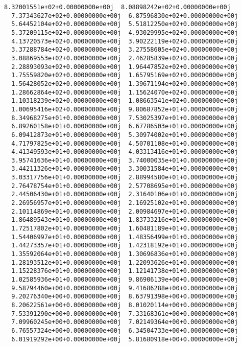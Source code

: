 \documentclass[11pt]{article}
\begin{document}
\begin{Verbatim}[commandchars=\\\{\}]
  8.32001551e+02+0.00000000e+00j  8.08898242e+02+0.00000000e+00j
  7.37343627e+02+0.00000000e+00j  6.87596830e+02+0.00000000e+00j
  5.64452104e+02+0.00000000e+00j  5.51812250e+02+0.00000000e+00j
  5.37209115e+02+0.00000000e+00j  4.93029995e+02+0.00000000e+00j
  4.13720573e+02+0.00000000e+00j  3.90222119e+02+0.00000000e+00j
  3.37288784e+02+0.00000000e+00j  3.27558605e+02+0.00000000e+00j
  3.08869553e+02+0.00000000e+00j  2.46285839e+02+0.00000000e+00j
  2.28893093e+02+0.00000000e+00j  1.96447852e+02+0.00000000e+00j
  1.75559820e+02+0.00000000e+00j  1.65795169e+02+0.00000000e+00j
  1.56428052e+02+0.00000000e+00j  1.39671194e+02+0.00000000e+00j
  1.28662864e+02+0.00000000e+00j  1.15624070e+02+0.00000000e+00j
  1.10318239e+02+0.00000000e+00j  1.08663541e+02+0.00000000e+00j
  1.00695416e+02+0.00000000e+00j  9.80687852e+01+0.00000000e+00j
  8.34968275e+01+0.00000000e+00j  7.53025397e+01+0.00000000e+00j
  6.89260158e+01+0.00000000e+00j  6.67786503e+01+0.00000000e+00j
  6.09412873e+01+0.00000000e+00j  5.30974002e+01+0.00000000e+00j
  4.71797825e+01+0.00000000e+00j  4.50701108e+01+0.00000000e+00j
  4.41349593e+01+0.00000000e+00j  4.03313416e+01+0.00000000e+00j
  3.95741636e+01+0.00000000e+00j  3.74000035e+01+0.00000000e+00j
  3.44211326e+01+0.00000000e+00j  3.30031584e+01+0.00000000e+00j
  3.03317756e+01+0.00000000e+00j  2.88994580e+01+0.00000000e+00j
  2.76478754e+01+0.00000000e+00j  2.57708695e+01+0.00000000e+00j
  2.44506430e+01+0.00000000e+00j  2.31640106e+01+0.00000000e+00j
  2.26956957e+01+0.00000000e+00j  2.16925102e+01+0.00000000e+00j
  2.10114869e+01+0.00000000e+00j  2.00984697e+01+0.00000000e+00j
  1.86489543e+01+0.00000000e+00j  1.83733216e+01+0.00000000e+00j
  1.72517802e+01+0.00000000e+00j  1.60481189e+01+0.00000000e+00j
  1.54406997e+01+0.00000000e+00j  1.48356499e+01+0.00000000e+00j
  1.44273357e+01+0.00000000e+00j  1.42318192e+01+0.00000000e+00j
  1.35592064e+01+0.00000000e+00j  1.30696836e+01+0.00000000e+00j
  1.28193512e+01+0.00000000e+00j  1.22093626e+01+0.00000000e+00j
  1.15228376e+01+0.00000000e+00j  1.12141738e+01+0.00000000e+00j
  1.02585936e+01+0.00000000e+00j  9.86906139e+00+0.00000000e+00j
  9.58794460e+00+0.00000000e+00j  9.41686288e+00+0.00000000e+00j
  9.20276340e+00+0.00000000e+00j  8.63791398e+00+0.00000000e+00j
  8.20622561e+00+0.00000000e+00j  8.01020114e+00+0.00000000e+00j
  7.53391290e+00+0.00000000e+00j  7.33168361e+00+0.00000000e+00j
  7.09960245e+00+0.00000000e+00j  7.02149364e+00+0.00000000e+00j
  6.76557324e+00+0.00000000e+00j  6.34504733e+00+0.00000000e+00j
  6.01919292e+00+0.00000000e+00j  5.81680918e+00+0.00000000e+00j

\end{Verbatim}
\end{document}
